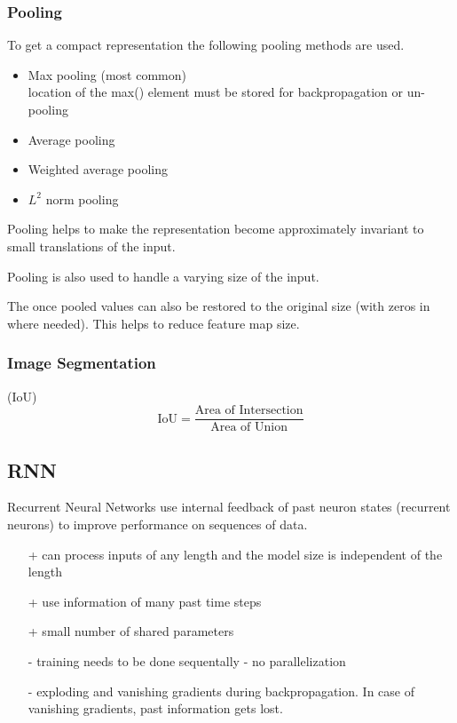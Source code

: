 \subsubsection{Pooling}
To get a compact representation the following pooling methods are used.
\begin{itemize}
    \item Max pooling (most common)
          \\ location of the max() element must be stored for backpropagation or un-pooling
    \item Average pooling
    \item Weighted average pooling
    \item $L^2$ norm pooling
\end{itemize}

Pooling helps to make the representation become approximately invariant to small translations of the input.

Pooling is also used to handle a varying size of the input.

\newpar{}

The once pooled values can also be restored to the original size (with zeros in where needed). This helps to reduce feature map size.

\subsubsection{Image Segmentation}

 (IoU)
\begin{equation*}
    \text{IoU} = \frac{\text{Area of Intersection}}{\text{Area of Union}}
\end{equation*}


\subsection{RNN}\label{sec:RNN}
Recurrent Neural Networks use internal feedback of past neuron states (recurrent neurons) to improve performance on sequences of data.
\begin{itemize}
    \item[+] can process inputs of any length and the model size is independent of the length
    \item[+] use information of many past time steps
    \item[+] small number of shared parameters
    \item[-] training needs to be done sequentally - no parallelization
    \item[-] exploding and vanishing gradients during backpropagation. In case of vanishing gradients, past information gets lost.
\end{itemize}
\newpar{}

